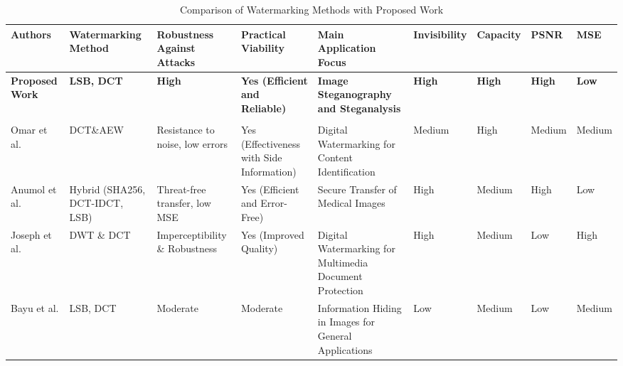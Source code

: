 \documentclass{ieeeaccess}
\begin{document}
\begin{table}[h] %
  \centering
  \caption{Comparison of Watermarking Methods with Proposed Work}
  \label{tab:watermarking_comparison}
  \begin{center}
  \begin{tabular}{|m{2cm}|m{1.6cm}|m{1.5cm}|m{1.5cm}|m{1.5cm}|m{1.2cm}|m{1.2cm}|m{1.2cm}|m{1.2cm}|}
    \hline
    \textbf{Authors} & \textbf{Watermarking Method} & \textbf{Robustness Against Attacks} & \textbf{Practical Viability} & \textbf{Main Application Focus} & \textbf{Invisibility} & \textbf{Capacity} & \textbf{PSNR} & \textbf{MSE} \\
    \hline
    \textbf{Proposed Work} & \textbf{LSB, DCT} & \textbf{High} & \textbf{Yes (Efficient and Reliable)} & \textbf{Image Steganography and Steganalysis} & \textbf{High} & \textbf{High} & \textbf{High} & \textbf{Low} \\
     & & & & & & & & \\
    \hline
    Omar et al. \cite{b2} & DCT\&AEW & Resistance to noise, low errors & Yes (Effectiveness with Side Information) & Digital Watermarking for Content Identification & Medium & High & Medium & Medium \\
    \hline
    Anumol et al. \cite{b3} & Hybrid (SHA256, DCT-IDCT, LSB) & Threat-free transfer, low MSE & Yes (Efficient and Error-Free) & Secure Transfer of Medical Images & High & Medium & High & Low \\
    \hline
    Joseph et al. \cite{b10} & DWT \& DCT & Imperceptibility \& Robustness & Yes (Improved Quality) & Digital Watermarking for Multimedia Document Protection & High & Medium & Low & High \\
    \hline
    Bayu et al. \cite{b67} & LSB, DCT & Moderate & Moderate & Information Hiding in Images for General Applications & Low & Medium & Low & Medium \\
    \hline
  \end{tabular}
  \end{center}

\end{table}
\end{document}
